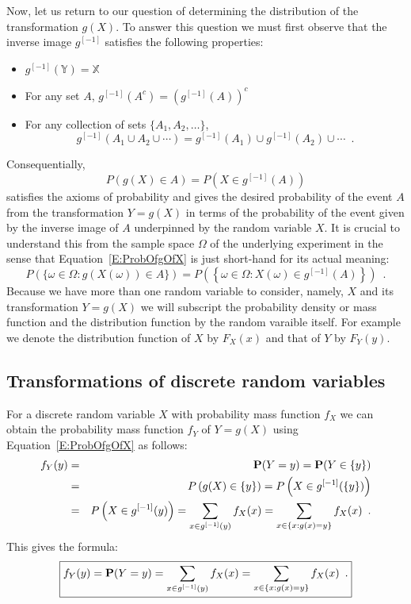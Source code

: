 Now, let us return to our question of determining the distribution of the transformation $g(X)$.  To answer this question we must first observe that the inverse image $g^{[-1]}$ satisfies the following properties:
\begin{itemize}
\item $g^{[-1]}(\mathbb{Y}) = \mathbb{X}$
\item For any set $A$, $g^{[-1]}(A^c) = \left(g^{[-1]}(A)\right)^c$
\item For any collection of sets $\{A_1,A_2,\ldots\}$,
\[
g^{[-1]}\left( A_1 \cup A_2 \cup \cdots \right) = g^{[-1]}(A_1) \cup g^{[-1]}(A_2) \cup \cdots \enspace.
\]
\end{itemize}
Consequentially, 
\begin{equation}\label{E:ProbOfgOfX}
\boxed{P \left( g(X) \in A \right) = P \left(X \in g^{[-1]}(A) \right)}
\end{equation} 
satisfies the axioms of probability and gives the desired probability of the event $A$ from the transformation $Y=g(X)$ in terms of the probability of the event given by the inverse image of $A$ underpinned by the random variable $X$.  
It is crucial to understand this from the sample space $\Omega$ of the underlying experiment in the sense that Equation~\eqref{E:ProbOfgOfX} is just short-hand for its actual meaning:
\[
P \left( \{\omega \in \Omega: g(X(\omega)) \in A\} \right) 
= P \left( \left\{ \omega \in \Omega: X(\omega) \in g^{[-1]}(A) \right\} \right) \enspace .
\]
Because we have more than one random variable to consider, namely, $X$ and its transformation $Y=g(X)$ we will subscript the probability density or mass function and the distribution function by the random varaible itself.  For example we denote the distribution function of $X$ by $F_X(x)$ and that of $Y$ by $F_Y(y)$.

\subsection{Transformations of discrete random variables}\label{TransformationsOFDiscreteRvs}
For a discrete random variable $X$ with probability mass function $f_X$ we can obtain the probability mass function $f_Y$ of $Y=g(X)$ using Equation~\eqref{E:ProbOfgOfX} as follows:
\begin{eqnarray*}
f_Y(y) 
&=& \mathbf{P}(Y =y) = \mathbf{P}(Y \in \{y\}) \\
&=& P \left( g(X) \in \{y\} \right) = P \left(X \in g^{[-1]}(\{y\}) \right)\\
&=& P \left(X \in g^{[-1]}(y) \right) = \sum_{x \in g^{[-1]}(y)} f_X(x) = \sum_{x \in \{x: g(x)=y\}} f_X(x) \enspace .
\end{eqnarray*}
This gives the formula:
\begin{equation}\label{E:PMFOfgOfX}
\boxed{
f_Y(y) = \mathbf{P}(Y =y) = \sum_{x \in g^{[-1]}(y)} f_X(x) = \sum_{x \in \{x: g(x)=y\}} f_X(x) \enspace .
}
\end{equation}

